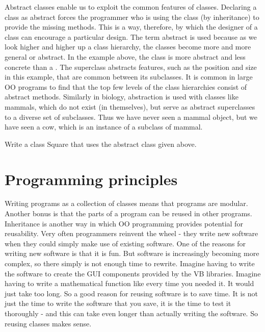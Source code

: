 		Abstract classes enable us to exploit the common features of classes. Declaring a class as abstract forces the programmer who is using the class (by inheritance) to provide the missing methods. This is a way, therefore, by which the designer of a class can encourage a particular design. The term abstract is used because as we look higher and higher up a class hierarchy, the classes become more and more general or abstract. In the example above, the class  is more abstract and less concrete than a . The superclass abstracts features, such as the position and size in this example, that are common between its subclasses. It is common in large OO programs to find that the top few levels of the class hierarchies consist of abstract methods. Similarly in biology, abstraction is used with classes like mammals, which do not exist (in themselves), but serve as abstract superclasses to a diverse set of subclasses. Thus we have never seen a mammal object, but we have seen a cow, which is an instance of a subclass of mammal.

		\begin{stqb}
			\begin{STQ}
				\item Write a class Square that uses the abstract class  given above.
			\end{STQ}
		\end{stqb}


	\section{Programming principles}
		Writing programs as a collection of classes means that programs are modular. Another bonus is that the parts of a program can be reused in other programs. Inheritance is another way in which OO programming provides potential for reusability. Very often programmers reinvent the wheel - they write new software when they could simply make use of existing software. One of the reasons for writing new software is that it is fun. But software is increasingly becoming more complex, so there simply is not enough time to rewrite. Imagine having to write the software to create the GUI components provided by the VB libraries. Imagine having to write a mathematical function like  every time you needed it. It would just take too long. So a good reason for reusing software is to save time. It is not just the time to write the software that you save, it is the time to test it thoroughly - and this can take even longer than actually writing the software. So reusing classes makes sense.

